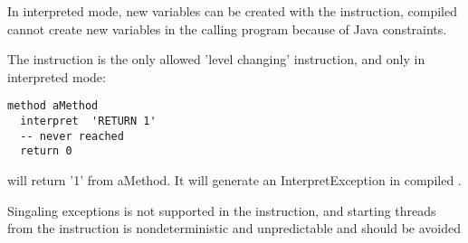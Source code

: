 In interpreted mode, new variables can be created with the  instruction, compiled \nr{} cannot
create new variables in the calling program because of Java constraints.

The  instruction is the only allowed 'level changing' instruction, and only in interpreted mode:

\begin{lstlisting}
method aMethod
  interpret  'RETURN 1'
  -- never reached
  return 0
\end{lstlisting}
will return '1' from aMethod.
It will generate an InterpretException in compiled \nr{}.

Singaling exceptions is not supported in the  instruction, and starting threads from the instruction
is nondeterministic and unpredictable and should be avoided

